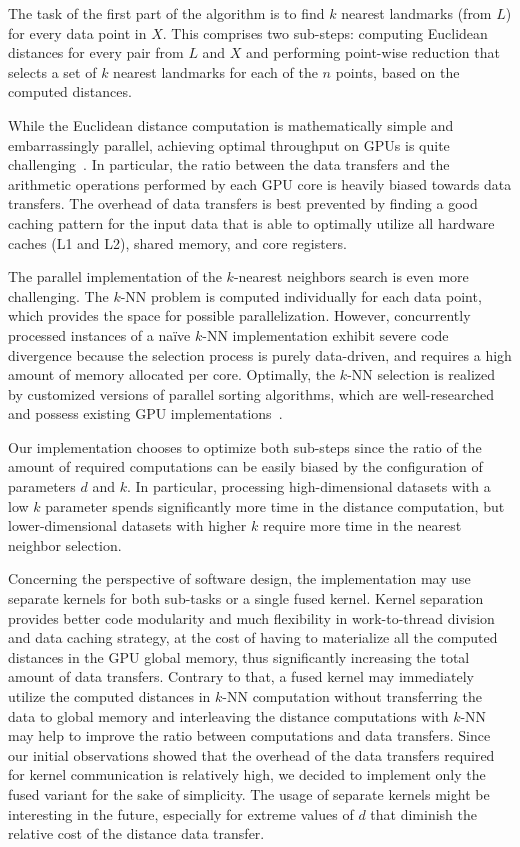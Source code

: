 The task of the first part of the algorithm is to find $k$ nearest landmarks (from $L$) for every data point in $X$.
This comprises two sub-steps: computing Euclidean distances for every pair from $L$ and $X$ and performing point-wise reduction that selects a set of $k$ nearest landmarks for each of the $n$ points, based on the computed distances.

While the Euclidean distance computation is mathematically simple and embarrassingly parallel, achieving optimal throughput on GPUs is quite challenging~\cite{krulivs2017employing}.
In particular, the ratio between the data transfers and the arithmetic operations performed by each GPU core is heavily biased towards data transfers.
The overhead of data transfers is best prevented by finding a good caching pattern for the input data that is able to optimally utilize all hardware caches (L1 and L2), shared memory, and core registers.

The parallel implementation of the $k$-nearest neighbors search is even more challenging.
The $k$-NN problem is computed individually for each data point, which provides the space for possible parallelization.
However, concurrently processed instances of a na\"{i}ve $k$-NN implementation exhibit severe code divergence because the selection process is purely data-driven, and requires a high amount of memory allocated per core.
Optimally, the $k$-NN selection is realized by customized versions of parallel sorting algorithms, which are well-researched and possess existing GPU implementations~\cite{singh2018survey}.

Our implementation chooses to optimize both sub-steps since the ratio of the amount of required computations can be easily biased by the configuration of parameters $d$ and $k$.
In particular, processing high-dimensional datasets with a low $k$ parameter spends significantly more time in the distance computation, but lower-dimensional datasets with higher $k$ require more time in the nearest neighbor selection.

Concerning the perspective of software design, the implementation may use separate kernels for both sub-tasks or a single fused kernel.
Kernel separation provides better code modularity and much flexibility in work-to-thread division and data caching strategy, at the cost of having to materialize all the computed distances in the GPU global memory, thus significantly increasing the total amount of data transfers.
Contrary to that, a fused kernel may immediately utilize the computed distances in $k$-NN computation without transferring the data to global memory and interleaving the distance computations with $k$-NN may help to improve the ratio between computations and data transfers.
Since our initial observations showed that the overhead of the data transfers required for kernel communication is relatively high, we decided to implement only the fused variant for the sake of simplicity.
The usage of separate kernels might be interesting in the future, especially for extreme values of $d$ that diminish the relative cost of the distance data transfer.

